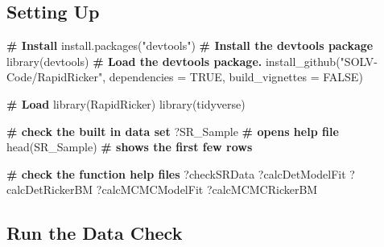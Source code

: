 \documentclass[french,11pt]{book}
\newenvironment{Shaded}{\begin{snugshade}}{\end{snugshade}}
\newcommand{\AttributeTok}[1]{\textcolor[rgb]{0.77,0.63,0.00}{#1}}
\newcommand{\CommentTok}[1]{\textcolor[rgb]{0.56,0.35,0.01}{\textbf{#1}}}
\newcommand{\ConstantTok}[1]{\textcolor[rgb]{0.00,0.00,0.00}{#1}}
\newcommand{\FunctionTok}[1]{\textcolor[rgb]{0.00,0.00,0.00}{#1}}
\newcommand{\NormalTok}[1]{#1}
\newcommand{\OtherTok}[1]{\textcolor[rgb]{0.56,0.35,0.01}{#1}}
\newcommand{\SpecialCharTok}[1]{\textcolor[rgb]{0.00,0.00,0.00}{#1}}
\newcommand{\StringTok}[1]{\textcolor[rgb]{0.31,0.60,0.02}{#1}}
\begin{document}
\subsection{Setting Up}\label{setting-up}
\begin{Shaded}
\begin{Highlighting}[]

\CommentTok{\# Install}
\FunctionTok{install.packages}\NormalTok{(}\StringTok{"devtools"}\NormalTok{) }\CommentTok{\# Install the devtools package}
\FunctionTok{library}\NormalTok{(devtools) }\CommentTok{\# Load the devtools package.}
\FunctionTok{install\_github}\NormalTok{(}\StringTok{"SOLV{-}Code/RapidRicker"}\NormalTok{, }\AttributeTok{dependencies =} \ConstantTok{TRUE}\NormalTok{,}
               \AttributeTok{build\_vignettes =} \ConstantTok{FALSE}\NormalTok{)}

\CommentTok{\# Load}
\FunctionTok{library}\NormalTok{(RapidRicker)    }
\FunctionTok{library}\NormalTok{(tidyverse)  }

\CommentTok{\# check the built in data set}
\NormalTok{?SR\_Sample }\CommentTok{\# opens help file}
\FunctionTok{head}\NormalTok{(SR\_Sample) }\CommentTok{\# shows the first few rows}

\CommentTok{\# check the function help files}
\NormalTok{?checkSRData}
\NormalTok{?calcDetModelFit}
\NormalTok{?calcDetRickerBM}
\NormalTok{?calcMCMCModelFit}
\NormalTok{?calcMCMCRickerBM }
\end{Highlighting}
\end{Shaded}
\subsection{Run the Data Check}\label{run-the-data-check}
\begin{Shaded}
\end{Shaded}
\end{document}
